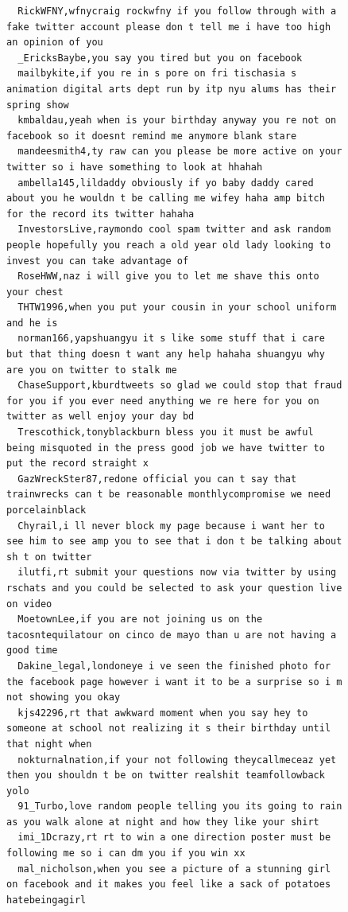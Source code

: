 \begin{figure}[htpb]
\begin{verbatim}
  RickWFNY,wfnycraig rockwfny if you follow through with a fake twitter account please don t tell me i have too high an opinion of you
  _EricksBaybe,you say you tired but you on facebook
  mailbykite,if you re in s pore on fri tischasia s animation digital arts dept run by itp nyu alums has their spring show
  kmbaldau,yeah when is your birthday anyway you re not on facebook so it doesnt remind me anymore blank stare
  mandeesmith4,ty raw can you please be more active on your twitter so i have something to look at hhahah
  ambella145,lildaddy obviously if yo baby daddy cared about you he wouldn t be calling me wifey haha amp bitch for the record its twitter hahaha
  InvestorsLive,raymondo cool spam twitter and ask random people hopefully you reach a old year old lady looking to invest you can take advantage of
  RoseHWW,naz i will give you to let me shave this onto your chest
  THTW1996,when you put your cousin in your school uniform and he is
  norman166,yapshuangyu it s like some stuff that i care but that thing doesn t want any help hahaha shuangyu why are you on twitter to stalk me
  ChaseSupport,kburdtweets so glad we could stop that fraud for you if you ever need anything we re here for you on twitter as well enjoy your day bd
  Trescothick,tonyblackburn bless you it must be awful being misquoted in the press good job we have twitter to put the record straight x
  GazWreckSter87,redone official you can t say that trainwrecks can t be reasonable monthlycompromise we need porcelainblack
  Chyrail,i ll never block my page because i want her to see him to see amp you to see that i don t be talking about sh t on twitter
  ilutfi,rt submit your questions now via twitter by using rschats and you could be selected to ask your question live on video
  MoetownLee,if you are not joining us on the tacosntequilatour on cinco de mayo than u are not having a good time
  Dakine_legal,londoneye i ve seen the finished photo for the facebook page however i want it to be a surprise so i m not showing you okay
  kjs42296,rt that awkward moment when you say hey to someone at school not realizing it s their birthday until that night when
  nokturnalnation,if your not following theycallmeceaz yet then you shouldn t be on twitter realshit teamfollowback yolo
  91_Turbo,love random people telling you its going to rain as you walk alone at night and how they like your shirt
  imi_1Dcrazy,rt rt to win a one direction poster must be following me so i can dm you if you win xx
  mal_nicholson,when you see a picture of a stunning girl on facebook and it makes you feel like a sack of potatoes hatebeingagirl

\end{verbatim}
\end{figure}
